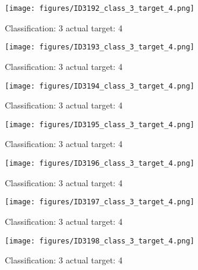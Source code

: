 \begin{figure}[h!]
\begin{center}
\texttt{[image: figures/ID3192\_class\_3\_target\_4.png]}
\end{center}
\caption{ Classification: 3 actual target: 4}
\label{fig:ID3192_class_3_target_4}
\end{figure}
\begin{figure}[h!]
\begin{center}
\texttt{[image: figures/ID3193\_class\_3\_target\_4.png]}
\end{center}
\caption{ Classification: 3 actual target: 4}
\label{fig:ID3193_class_3_target_4}
\end{figure}
\begin{figure}[h!]
\begin{center}
\texttt{[image: figures/ID3194\_class\_3\_target\_4.png]}
\end{center}
\caption{ Classification: 3 actual target: 4}
\label{fig:ID3194_class_3_target_4}
\end{figure}
\begin{figure}[h!]
\begin{center}
\texttt{[image: figures/ID3195\_class\_3\_target\_4.png]}
\end{center}
\caption{ Classification: 3 actual target: 4}
\label{fig:ID3195_class_3_target_4}
\end{figure}
\begin{figure}[h!]
\begin{center}
\texttt{[image: figures/ID3196\_class\_3\_target\_4.png]}
\end{center}
\caption{ Classification: 3 actual target: 4}
\label{fig:ID3196_class_3_target_4}
\end{figure}
\begin{figure}[h!]
\begin{center}
\texttt{[image: figures/ID3197\_class\_3\_target\_4.png]}
\end{center}
\caption{ Classification: 3 actual target: 4}
\label{fig:ID3197_class_3_target_4}
\end{figure}
\begin{figure}[h!]
\begin{center}
\texttt{[image: figures/ID3198\_class\_3\_target\_4.png]}
\end{center}
\caption{ Classification: 3 actual target: 4}
\label{fig:ID3198_class_3_target_4}
\end{figure}
